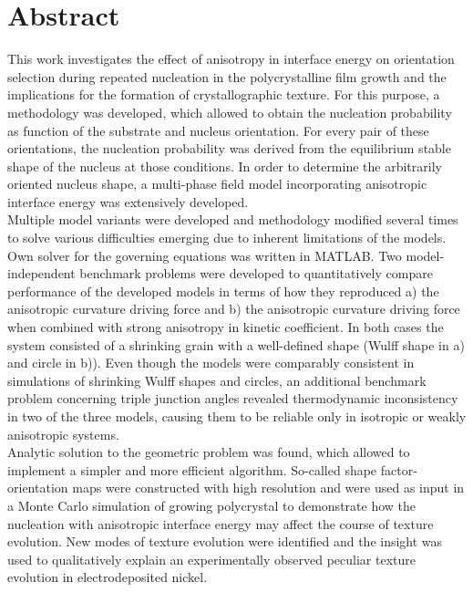 \chapter{Abstract}                                 \label{ch:abstract}
This work investigates the effect of anisotropy in interface energy on orientation selection during repeated nucleation in the polycrystalline film growth and the implications for the formation of crystallographic texture. For this purpose, a methodology was developed, which allowed to obtain the nucleation probability as function of the substrate and nucleus orientation. For every pair of these orientations, the nucleation probability was derived from the equilibrium stable shape of the nucleus at those conditions. In order to determine the arbitrarily oriented nucleus shape, a multi-phase field model incorporating anisotropic interface energy was extensively developed.  \\
Multiple model variants were developed and methodology modified several times to solve various difficulties emerging due to inherent limitations of the models. Own solver for the governing equations was written in MATLAB. Two model-independent benchmark problems were developed to quantitatively compare performance of the developed models in terms of how they reproduced a) the anisotropic curvature driving force and b) the anisotropic curvature driving force when combined with strong anisotropy in kinetic coefficient. In both cases the system consisted of a shrinking grain with a well-defined shape (Wulff shape in a) and circle in b)). Even though the models were comparably consistent in simulations of shrinking Wulff shapes and circles, an additional benchmark problem concerning triple junction angles revealed thermodynamic inconsistency in two of the three models, causing them to be reliable only in isotropic or weakly anisotropic systems.\\
Analytic solution to the geometric problem was found, which allowed to implement a simpler and more efficient algorithm. So-called shape factor-orientation maps were constructed with high resolution and were used as input in a Monte Carlo simulation of growing polycrystal to demonstrate how the nucleation with anisotropic interface energy may affect the course of texture evolution. New modes of texture evolution were identified and the insight was used to qualitatively explain an experimentally observed peculiar texture evolution in electrodeposited nickel. 


